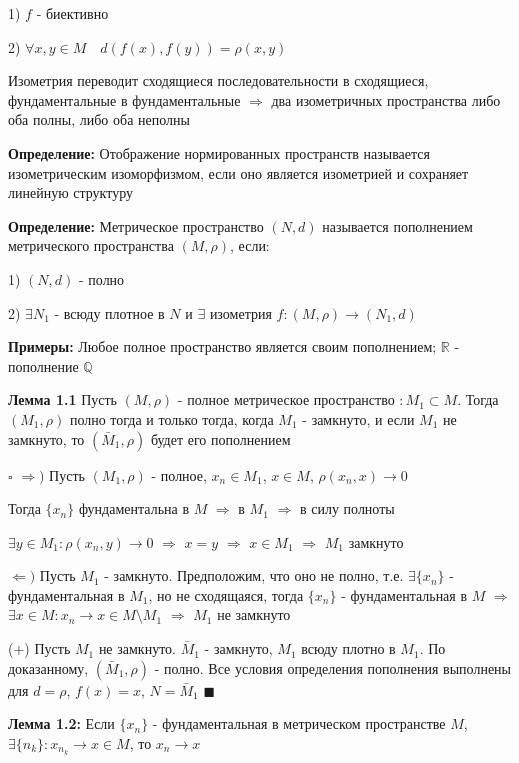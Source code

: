 \documentclass[a4paper]{report}
\begin{document}
1) $f$ - биективно

2) $\forall x,y\in M\quad d(f(x),f(y))=\rho(x,y)$

Изометрия переводит сходящиеся последовательности в сходящиеся, фундаментальные в фундаментальные $\Rightarrow$ два 
изометричных пространства либо оба полны, либо оба неполны
\bigskip

\noindent\textbf{Определение:} Отображение нормированных пространств называется изометрическим изоморфизмом, если оно 
является изометрией и сохраняет линейную структуру
\bigskip

\noindent\textbf{Определение:} Метрическое пространство $(N,d)$ называется пополнением метрического пространства $(M,\rho)$, если:

1) $(N,d)$ - полно

2) $\exists N_1$ - всюду плотное в $N$ и $\exists$ изометрия $f\colon (M,\rho)\to(N_1,d)$
\bigskip

\noindent\textbf{Примеры:} Любое полное пространство является своим пополнением; $\mathbb R$ - пополнение $\mathbb Q$
\bigskip

\noindent\textbf{Лемма 1.1} Пусть $(M,\rho)$ - полное метрическое пространство $\colon M_1\subset M$. Тогда $(M_1,\rho)$ 
полно тогда и только тогда, когда $M_1$ - замкнуто, и если $M_1$ не замкнуто, то $(\bar M_1,\rho)$ будет его пополнением

\noindent $\square$ $\Rightarrow)$ Пусть $(M_1,\rho)$ - полное, $x_n\in M_1$, $x\in M$, $\rho(x_n,x)\to0$

Тогда $\{x_n\}$ фундаментальна в $M$ $\Rightarrow$ в $M_1$ $\Rightarrow$ в силу полноты

 $\exists y\in M_1\colon\rho(x_n,y)\to0$
$\Rightarrow$ $x=y$ $\Rightarrow$ $x\in M_1$ $\Rightarrow$ $M_1$ замкнуто

$\Leftarrow)$ Пусть $M_1$ - замкнуто. Предположим, что оно не полно, т.е. $\exists\{x_n\}$ - фундаментальная в $M_1$, 
но не сходящаяся, тогда $\{x_n\}$ - фундаментальная в $M$ $\Rightarrow$ $\exists x\in M\colon x_n\to x\in M\setminus M_1$
$\Rightarrow$ $M_1$ не замкнуто

(+) Пусть $M_1$ не замкнуто. $\bar M_1$ - замкнуто, $M_1$ всюду плотно в $M_1$. По доказанному, $(\bar M_1,\rho)$ - 
полно. Все условия определения пополнения выполнены для $d=\rho$, $f(x)=x$, $N=\bar M_1$ $\blacksquare$
\bigskip

\noindent\textbf{Лемма 1.2:} Если $\{x_n\}$ - фундаментальная в метрическом пространстве $M$, $\exists\{n_k\}\colon
x_{n_k}\to x\in M$, то $x_n\to x$
\end{document}
